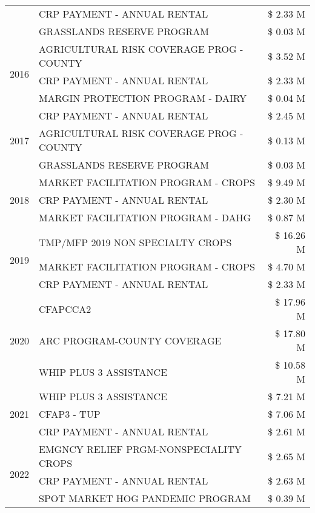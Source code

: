 \begin{tabular}{llr}
 & CRP PAYMENT - ANNUAL RENTAL & \$ 2.33 M \\
 & GRASSLANDS RESERVE PROGRAM & \$ 0.03 M \\
\cline{1-3}
\multirow[t]{3}{*}{2016} & AGRICULTURAL RISK COVERAGE PROG - COUNTY & \$ 3.52 M \\
 & CRP PAYMENT - ANNUAL RENTAL & \$ 2.33 M \\
 & MARGIN PROTECTION PROGRAM - DAIRY & \$ 0.04 M \\
\cline{1-3}
\multirow[t]{3}{*}{2017} & CRP PAYMENT - ANNUAL RENTAL & \$ 2.45 M \\
 & AGRICULTURAL RISK COVERAGE PROG - COUNTY & \$ 0.13 M \\
 & GRASSLANDS RESERVE PROGRAM & \$ 0.03 M \\
\cline{1-3}
\multirow[t]{3}{*}{2018} & MARKET FACILITATION PROGRAM - CROPS & \$ 9.49 M \\
 & CRP PAYMENT - ANNUAL RENTAL & \$ 2.30 M \\
 & MARKET FACILITATION PROGRAM - DAHG & \$ 0.87 M \\
\cline{1-3}
\multirow[t]{3}{*}{2019} & TMP/MFP 2019 NON SPECIALTY CROPS & \$ 16.26 M \\
 & MARKET FACILITATION PROGRAM - CROPS & \$ 4.70 M \\
 & CRP PAYMENT - ANNUAL RENTAL & \$ 2.33 M \\
\cline{1-3}
\multirow[t]{3}{*}{2020} & CFAPCCA2 & \$ 17.96 M \\
 & ARC PROGRAM-COUNTY COVERAGE & \$ 17.80 M \\
 & WHIP PLUS 3 ASSISTANCE & \$ 10.58 M \\
\cline{1-3}
\multirow[t]{3}{*}{2021} & WHIP PLUS 3 ASSISTANCE & \$ 7.21 M \\
 & CFAP3 - TUP & \$ 7.06 M \\
 & CRP PAYMENT - ANNUAL RENTAL & \$ 2.61 M \\
\cline{1-3}
\multirow[t]{3}{*}{2022} & EMGNCY RELIEF PRGM-NONSPECIALITY CROPS & \$ 2.65 M \\
 & CRP PAYMENT - ANNUAL RENTAL & \$ 2.63 M \\
 & SPOT MARKET HOG PANDEMIC PROGRAM & \$ 0.39 M \\
\cline{1-3}
\bottomrule
\end{tabular}
